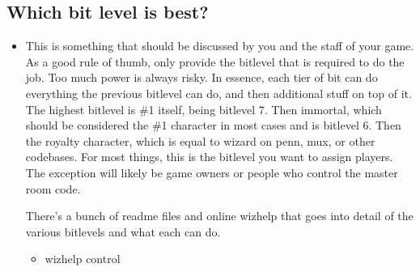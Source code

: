 \documentclass[letterpaper,10pt,english]{sphinxmanual}
\begin{document}
\subsection{Which bit level is best?}
\label{\detokenize{features:which-bit-level-is-best}}\begin{itemize}
\item {} 
\sphinxAtStartPar
This is something that should be discussed by you and the staff
of your game.  As a good rule of thumb, only provide the bitlevel
that is required to do the job.  Too much power is always risky.
In essence, each tier of bit can do everything the previous bitlevel
can do, and then additional stuff on top of it.  The highest bitlevel
is \#1 itself, being bitlevel 7.  Then immortal, which should be
considered the \#1 character in most cases and is bitlevel 6.  Then
the royalty character, which is equal to wizard on penn, mux, or
other codebases.  For most things, this is the bitlevel you want
to assign players.  The exception will likely be game owners or
people who control the master room code.

\sphinxAtStartPar
There’s a bunch of readme files and online wizhelp that goes into
detail of the various bitlevels and what each can do.
\begin{itemize}
\item {} 
\sphinxAtStartPar
wizhelp control

\end{itemize}

\end{itemize}
\end{document}
